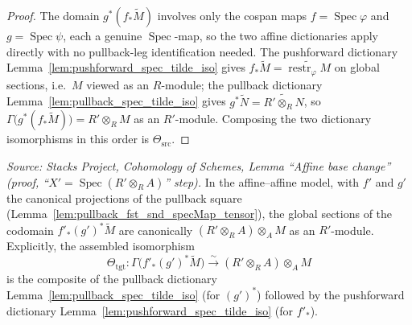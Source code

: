 \begin{proof}
  The domain \(g^*(f_*\widetilde M)\) involves only the cospan maps
  \(f = \operatorname{Spec}\varphi\) and \(g = \operatorname{Spec}\psi\), each a genuine
  \(\operatorname{Spec}\)-map, so the two affine dictionaries apply directly with no
  pullback-leg identification needed. The pushforward dictionary
  Lemma~\ref{lem:pushforward_spec_tilde_iso} gives
  \(f_*\widetilde M = \widetilde{\operatorname{restr}_\varphi M}\) on global sections,
  i.e.\ \(M\) viewed as an \(R\)-module; the pullback dictionary
  Lemma~\ref{lem:pullback_spec_tilde_iso} gives
  \(g^*\widetilde N = \widetilde{R' \otimes_R N}\), so
  \(\Gamma\bigl(g^*(f_*\widetilde M)\bigr) = R' \otimes_R M\) as an \(R'\)-module.
  Composing the two dictionary isomorphisms in this order is \(\Theta_{\mathrm{src}}\).
\end{proof}

\begin{lemma}


  \label{lem:base_change_mate_codomain_read}
  \textit{Source: Stacks Project, Cohomology of Schemes, Lemma ``Affine base
  change'' (proof, ``\(X' = \operatorname{Spec}(R' \otimes_R A)\)'' step).}
  In the affine--affine model, with \(f'\) and \(g'\) the canonical projections of the
  pullback square (Lemma~\ref{lem:pullback_fst_snd_specMap_tensor}), the global
  sections of the codomain \(f'_*(g')^*\widetilde M\) are canonically
  \((R' \otimes_R A) \otimes_A M\) as an \(R'\)-module. Explicitly, the assembled
  isomorphism
  \[
    \Theta_{\mathrm{tgt}} :
    \Gamma\bigl(f'_*(g')^*\widetilde M\bigr)
    \xrightarrow{\ \sim\ } (R' \otimes_R A) \otimes_A M
  \]
  is the composite of the pullback dictionary Lemma~\ref{lem:pullback_spec_tilde_iso}
  (for \((g')^*\)) followed by the pushforward dictionary
  Lemma~\ref{lem:pushforward_spec_tilde_iso} (for \(f'_*\)).
\end{lemma}

